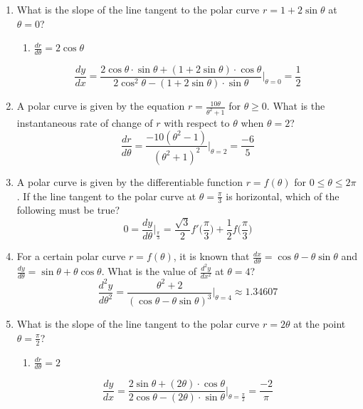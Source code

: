 \documentclass[12pt]{article}
\begin{document}
\begin{enumerate}
	\item What is the slope of the line tangent to the polar curve $r=1+2\sin \theta$ at $\theta=0$?
	      \begin{enumerate}
	      	\item $\frac{dr}{d\theta} = 2\cos \theta$
	      \end{enumerate}
	      $$\frac{dy}{dx} = \frac{2\cos\theta \cdot \sin \theta + (1+2\sin \theta) \cdot \cos\theta}{2\cos^2\theta -(1+2\sin \theta)\cdot \sin\theta}\biggr\rvert_{\theta=0} = \boxed{\frac{1}{2}}$$
	\item A polar curve is given by the equation $r=\frac{10\theta}{\theta^2+1}$ for $\theta \geq 0$. What is the instantaneous rate of change of $r$ with respect to $\theta$ when $\theta=2$?
	      $$\frac{dr}{d\theta} = \frac{-10(\theta^2-1)}{(\theta^2+1)^2}\biggr\rvert_{\theta = 2} = \boxed{\frac{-6}{5}}$$
	\item A polar curve is given by the differentiable function $r=f(\theta)$ for $0\leq \theta \leq 2\pi$. If the line tangent to the polar curve at $\theta=\frac{\pi}{3}$ is horizontal, which of the following must be true?
	      $$0=\frac{dy}{d\theta}\biggr\rvert_{\frac{\pi}{3}} = \boxed{\frac{\sqrt{3}}{2}f'\bigg(\frac{\pi}{3}\bigg)+\frac{1}{2}f\bigg(\frac{\pi}{3}\bigg)} $$
	\item For a certain polar curve $r=f(\theta)$, it is known that $\frac{dx}{d\theta} = \cos \theta - \theta\sin\theta$ and $\frac{dy}{d\theta} = \sin \theta + \theta\cos \theta$. What is the value of $\frac{d^2y}{dx^2}$ at $\theta=4$?
	      $$\frac{d^2y}{d\theta^2} = \frac{\theta^2+2}{(\cos\theta - \theta\sin\theta)^3}\biggr\rvert_{\theta = 4} \approx \boxed{1.34607}$$
	\item What is the slope of the line tangent to the polar curve $r=2\theta$ at the point $\theta=\frac{\pi}{2}$?
	      \begin{enumerate}
	      	\item $\frac{dr}{d\theta} = 2$
	      \end{enumerate}
	      $$\frac{dy}{dx} = \frac{2 \sin \theta + (2\theta) \cdot \cos\theta}{2\cos\theta -(2\theta)\cdot \sin\theta}\biggr\rvert_{\theta=\frac{\pi}{2}} = \boxed{\frac{-2}{\pi}}$$
	      	      	

\end{enumerate}
\end{document}

